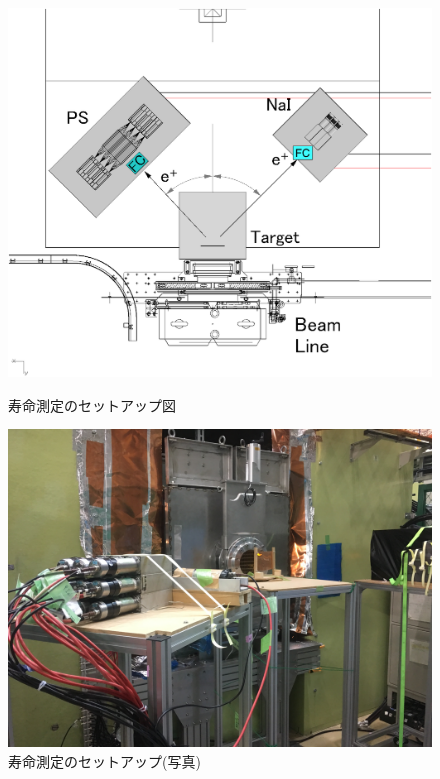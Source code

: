 \begin{figure}[H]
  \begin{minipage}{0.45\hsize}
    \begin{center}
      \includegraphics[width=1\textwidth]{figure/tajima/set_lifetime.png}
      \caption{寿命測定のセットアップ図}
      \label{set_life}
    \end{center}
  \end{minipage}
  \begin{minipage}{0.45\hsize}
    \begin{center}
      \includegraphics[width=1\textwidth]{figure/tajima/set_lifetime_1.png}
      \caption{寿命測定のセットアップ(写真)}
      \label{set_life2}
    \end{center}
  \end{minipage}
\end{figure}

